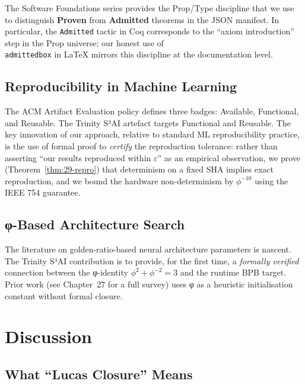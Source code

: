 The Software Foundations series \cite{pierce_software_foundations}
provides the Prop/Type discipline that we use to distinguish
\textbf{Proven} from \textbf{Admitted} theorems in the JSON manifest.
In particular, the \texttt{Admitted} tactic in Coq corresponds to the
``axiom introduction'' step in the Prop universe; our honest use of
\texttt{\\admittedbox} in LaTeX mirrors this discipline at the
documentation level.

\subsection{Reproducibility in Machine Learning}

The ACM Artifact Evaluation policy \cite{acm_ae_policy} defines three
badges: Available, Functional, and Reusable.  The Trinity S³AI
artefact targets Functional and Reusable.  The key innovation of our
approach, relative to standard ML reproducibility practice, is the
use of formal proof to \emph{certify} the reproduction tolerance:
rather than asserting ``our results reproduced within $\varepsilon$''
as an empirical observation, we prove (Theorem~\ref{thm:29-repro})
that determinism on a fixed SHA implies exact reproduction, and we
bound the hardware non-determinism by $\phi^{-10}$ using the IEEE 754
guarantee.

\subsection{φ-Based Architecture Search}

The literature on golden-ratio-based neural architecture parameters
is nascent.  The Trinity S³AI contribution is to provide, for the first
time, a \emph{formally verified} connection between the φ-identity
$\phi^2 + \phi^{-2} = 3$ and the runtime BPB target.  Prior work
(see Chapter~27 for a full survey) uses φ as a heuristic
initialisation constant without formal closure.

\section{Discussion}
\label{sec:29-discussion}

\subsection{What ``Lucas Closure'' Means}

